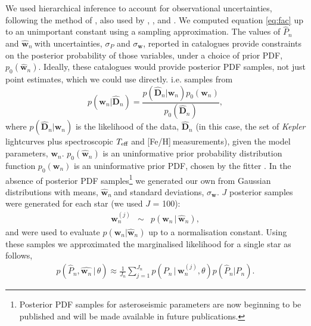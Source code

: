 \documentclass[11pt,preprint]{aastex}
\newcommand{\logg}{log \emph{g}}
\newcommand{\teff}{$T_{\rm{eff}}$}
\newcommand{\w}{\mathbf{w}}
\newcommand{\wh}{$\hat{\mathbf{w}}_n$}
\newcommand{\ph}{$\hat{P}_n$}
\newcommand{\feh}{[Fe/H]}
\begin{document}
We used hierarchical inference to account for observational uncertainties,
following the method of \citet{Hogg2010}, also used by
\citet{Foreman-Mackey2014}, \citet{Rogers2014}, \citet{Morton2014} and
\citet{Demory2014}.
We computed equation \ref{eq:fac} up to an unimportant constant
using a sampling approximation.
The values of \ph$~$and \wh$~$with uncertainties, $\sigma_P$ and
$\sigma_{\mathbf{w}}$, reported in catalogues provide constraints on the
posterior probability of those variables, under a choice of prior PDF,
$p_0(\hat{\mathbf{w}}_n)$.
Ideally, these catalogues would provide posterior PDF samples, not just point
estimates, which we could use directly.
i.e. samples from
\begin{equation}
	p(\mathbf{w}_n|\hat{\mathbf{D}}_n) =
	\frac{p(\hat{\mathbf{D}}_n|\mathbf{w}_n)p_0(\mathbf{w}_n)}
	{p_0(\hat{\mathbf{D}}_n)},
\end{equation}
where $p(\hat{\mathbf{D}}_n|\w_n)$ is the likelihood of the data,
$\hat{\mathbf{D}}_n$ (in this case,
the set of {\it Kepler} lightcurves plus spectroscopic \teff$~$and
\feh$~$measurements), given the model parameters, $\mathbf{w}_n$.
$p_0(\hat{\w}_n)$ is an uninformative prior probability distribution
function $p_0(\mathbf{w}_n)$ is an uninformative prior PDF, chosen by the
fitter \citep[][used a flat prior PDF in age and \logg]{Chaplin2014}.
In the absence of posterior PDF samples\footnote{Posterior PDF samples
for asteroseismic parameters are now beginning to be published and will be made
available in future publications.} we generated our own from Gaussian
distributions with means, \wh$~$and standard deviations, $\sigma_{\mathbf{w}}$.
$J$ posterior samples were generated for each star (we used $J$ = 100):
\begin{eqnarray}
\w_n^{(j)} &\sim& p(\w_n\,|\,\hat{\w}_n),
\end{eqnarray}
and were used to evaluate $p(\mathbf{w}_n|\hat{\mathbf{w}}_n)$ up to a
normalisation constant.
Using these samples we approximated the marginalised likelihood for a single
star as follows,
\begin{align}
	p(\hat{P}_n,\hat{\w_n}\,|\,\theta) \approx \frac{1}{J_n}
	\sum_{j=1}^{J_n}p(P_n\,|\,\mathbf{w}_n^{(j)},\theta)p(\hat{P}_n|P_n).
\end{align}
\end{document}
